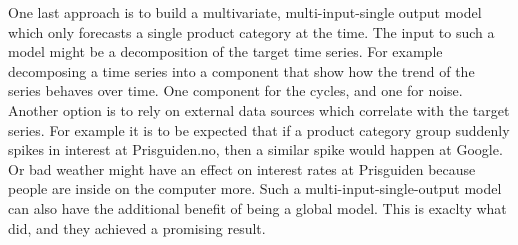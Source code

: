One last approach is to build a multivariate, multi-input-single output model which only forecasts a single product category
at the time. The input to such a model might be a decomposition of the target time series. 
For example decomposing a time series into a component that show how the trend of the series behaves over time.
One component for the cycles, and one for noise.
Another option is to rely on external data sources which correlate with the target series.
For example it is to be expected that if a product category group suddenly spikes in interest at Prisguiden.no,
then a similar spike would happen at Google.
Or bad weather might have an effect on interest rates at Prisguiden because people are inside on the computer more.
Such a multi-input-single-output model can also have the additional benefit of being a global model.
This is exaclty what \cite{Laptev} did, and they achieved a promising result.







%
